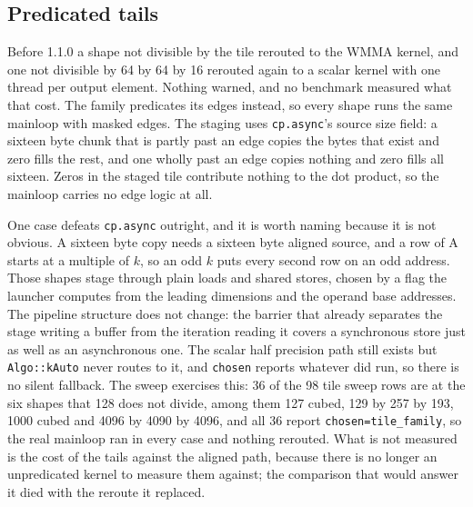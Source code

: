 \begin{table}[htbp]
\centering

\caption{The tile family. Registers and shared memory are compile time facts from
the resource usage report. Throughput is the committed tile sweep, all six rows at
the same shape, since a column that quoted each tile at whatever shape it happened
to be measured at would compare nothing.}
\label{tab:tiles}
\end{table}

\subsection{Predicated tails}

Before 1.1.0 a shape not divisible by the tile rerouted to the WMMA kernel, and
one not divisible by 64 by 64 by 16 rerouted again to a scalar kernel with one
thread per output element. Nothing warned, and no benchmark measured what that
cost. The family predicates its edges instead, so every shape runs the same
mainloop with masked edges. The staging uses \texttt{cp.async}'s source size
field: a sixteen byte chunk that is partly past an edge copies the bytes that
exist and zero fills the rest, and one wholly past an edge copies nothing and zero
fills all sixteen. Zeros in the staged tile contribute nothing to the dot product,
so the mainloop carries no edge logic at all.

One case defeats \texttt{cp.async} outright, and it is worth naming because it is
not obvious. A sixteen byte copy needs a sixteen byte aligned source, and a row of
A starts at a multiple of $k$, so an odd $k$ puts every second row on an odd
address. Those shapes stage through plain loads and shared stores, chosen by a
flag the launcher computes from the leading dimensions and the operand base
addresses. The pipeline structure does not change: the barrier that already
separates the stage writing a buffer from the iteration reading it covers a
synchronous store just as well as an asynchronous one. The scalar half precision
path still exists but \texttt{Algo::kAuto} never routes to it, and \texttt{chosen}
reports whatever did run, so there is no silent fallback. The sweep exercises this:
36 of the 98 tile sweep rows are at the six shapes that 128 does not divide, among
them 127 cubed, 129 by 257 by 193, 1000 cubed and 4096 by 4090 by 4096, and all 36
report \texttt{chosen=tile\_family}, so the real mainloop ran in every case and
nothing rerouted. What is not measured is the cost of the tails against the aligned
path, because there is no longer an unpredicated kernel to measure them against;
the comparison that would answer it died with the reroute it replaced.

